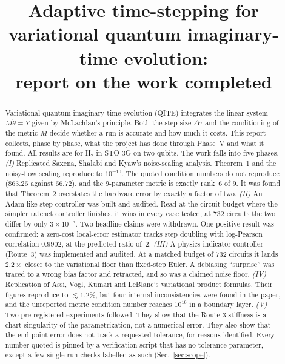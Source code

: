\documentclass[aps,pra,reprint,superscriptaddress,nofootinbib]{revtex4-2}
\newcommand{\dt}{\Delta\tau}
\newcommand{\thetadot}{\dot\theta}
\begin{document}
\title{Adaptive time-stepping for variational quantum imaginary-time evolution:\\
 report on the work completed}

\begin{abstract}
Variational quantum imaginary-time evolution (QITE) integrates the linear system
$M\thetadot=Y$ given by McLachlan's principle. Both the step size $\dt$ and the conditioning of
the metric $M$ decide whether a run is accurate and how much it costs. This report collects,
phase by phase, what the project has done through Phase~V and what it found. All results are for H$_2$
in STO-3G on two qubits. The work falls into five phases. \emph{(I)} Replicated Saxena,
Shalabi and Kyaw's noise-scaling analysis. Theorem~1 and the noisy-flow scaling reproduce to
$10^{-10}$. The quoted condition numbers do not reproduce ($863.26$ against $66.72$), and the
9-parameter metric is exactly rank~6 of 9. It was found that Theorem~2 overstates the
hardware error by exactly a factor of two. \emph{(II)} An Adam-like step controller was built
and audited. Read at the circuit budget where the simpler ratchet controller finishes, it wins in every case
tested; at 732 circuits the two differ by only $3\times10^{-5}$. Two headline claims were withdrawn. One positive result was confirmed: a zero-cost
local-error estimator tracks step doubling with log-Pearson correlation $0.9902$, at the
predicted ratio of~2. \emph{(III)} A physics-indicator controller (Route~3) was implemented
and audited. At a matched budget of 732 circuits it lands $2.2\times$ closer to the variational floor than
fixed-step Euler. A debiasing ``surprise'' was traced to a wrong bias factor and retracted,
and so was a claimed noise floor. \emph{(IV)} Replication of Assi, Vogl, Kumari and LeBlanc's
variational product formulas. Their figures reproduce to ${\lesssim}1.2\%$, but four internal inconsistencies were found in the paper, and the unreported metric condition number reaches $10^{16}$ in a boundary
layer. \emph{(V)} Two pre-registered experiments followed. They show that the Route-3 stiffness
is a chart singularity of the parametrization, not a numerical error. They also show that
the end-point error does not track a requested tolerance, for reasons identified. Every
number quoted is pinned by a verification script that has no tolerance parameter, except a few single-run checks labelled as such (Sec.~\ref{sec:scope}).
\end{abstract}

\maketitle
\end{document}
